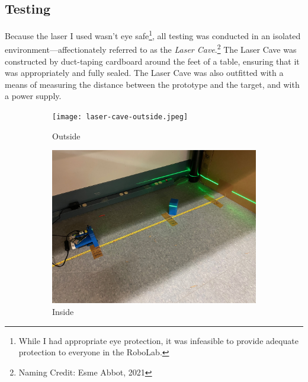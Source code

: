 \documentclass{article}
\begin{document}
\subsection{Testing} \label{sec:methods:testing}

Because the laser I used wasn't eye safe\footnote{While I had appropriate eye protection, it was infeasible to provide adequate protection to everyone in the RoboLab.}, all testing was conducted in an isolated environment---affectionately referred to as the \textit{Laser Cave}.\footnote{Naming Credit: Esme Abbot, 2021} The Laser Cave was constructed by duct-taping cardboard around the feet of a table, ensuring that it was appropriately and fully sealed. The Laser Cave was also outfitted with a means of measuring the distance between the prototype and the target, and with a power supply.

\begin{figure} [!h]

	\centering
	
	\begin{subfigure}{.5\textwidth}
	    \centering
    	\texttt{[image: laser-cave-outside.jpeg]}
    	\caption{Outside}
    	\label{fig:laser-cave:outside}
    \end{subfigure}%
	\begin{subfigure}{.5\textwidth}
	    \centering
    	\includegraphics[width=0.8\linewidth]{laser-cave-inside.jpeg}
    	\caption{Inside}
    	\label{fig:laser-cave:inside}
    \end{subfigure}
	
	\caption{}
	
	\label{fig:laser-cave}
\end{figure}
\end{document}
